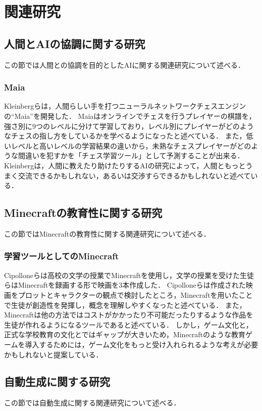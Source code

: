 \chapter{関連研究}	
\thispagestyle{plain}   %

\section{人間とAIの協調に関する研究}
この節では人間との協調を目的としたAIに関する関連研究について述べる．

\subsection{Maia}
Kleinbergらは，人間らしい手を打つニューラルネットワークチェスエンジンの“Maia”を開発した．
Maiaはオンラインでチェスを行うプレイヤーの棋譜を，強さ別に9つのレベルに分けて学習しており，レベル別にプレイヤーがどのようなチェスの指し方をしているかを学べるようになったと述べている．
また，低いレベルと高いレベルの学習結果の違いから，未熟なチェスプレイヤーがどのような間違いを犯すかを「チェス学習ツール」として予測することが出来る．
Kleinbergは，人間に教えたり助けたりするAIの研究によって，人間ともっとうまく交流できるかもしれない，あるいは交渉すらできるかもしれないと述べている．


\section{Minecraftの教育性に関する研究}
この節ではMinecraftの教育性に関する関連研究について述べる．

\subsection{学習ツールとしてのMinecraft}
Cipolloneらは高校の文学の授業でMinecraftを使用し，文学の授業を受けた生徒らはMinecraftを録画する形で映画を3本作成した．
Cipolloneらは作成された映画をプロットとキャラクターの観点で検討したところ，Minecraftを用いたことで生徒が創造性を発揮し，概念を理解しやすくなったと述べている．
また，Minecraftは他の方法ではコストがかかったり不可能だったりするような作品を生徒が作れるようになるツールであると述べている．
しかし，ゲーム文化と，正式な学校教育の文化とではギャップが大きいため，Minecraftのような教育ゲームを導入するためには，ゲーム文化をもっと受け入れられるような考えが必要かもしれないと提案している．


\section{自動生成に関する研究}
この節では自動生成に関する関連研究について述べる．

